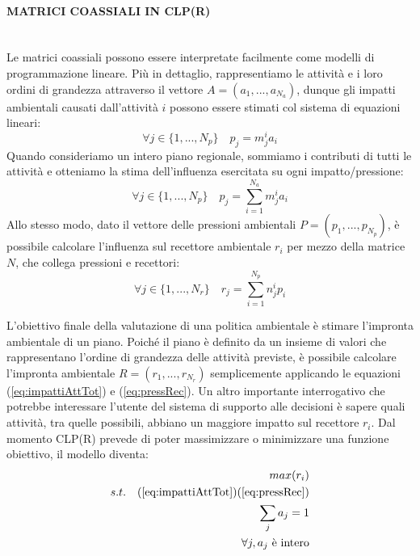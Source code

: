 \documentclass[12pt,a4paper,openright,twoside]{report}
\newcommand{\myparagraph}[1]{\paragraph{#1}\mbox{}\\}
\begin{document}
\myparagraph{MATRICI COASSIALI IN CLP(R)}
Le matrici coassiali possono essere interpretate facilmente come modelli di programmazione lineare. Più in dettaglio, rappresentiamo le attività e i loro ordini di grandezza attraverso il vettore $A = (a_1,...,a_{N_a})$, dunque gli impatti ambientali causati dall'attività $i$ possono essere stimati col sistema di equazioni lineari:
\begin{equation}
\label{eq:impattiAtt}
	\forall j \in \{1,...,N_p\}  \quad p_j = m_j^i a_i
\end{equation}
Quando consideriamo un intero piano regionale, sommiamo i contributi di tutti le attività e otteniamo la stima dell'influenza esercitata su ogni impatto/pressione:
\begin{equation}
\label{eq:impattiAttTot}
	\forall j \in \{1,...,N_p\}  \quad  p_j = \sum_{i=1}^{N_a} m_j^i a_i
\end{equation}
Allo stesso modo, dato il vettore delle pressioni ambientali $P = (p_1,...,p_{N_p})$, è possibile calcolare l'influenza sul recettore ambientale $r_i$ per mezzo della matrice $N$, che collega pressioni e recettori:
\begin{equation}
\label{eq:pressRec}
	\forall j \in \{1,...,N_r\}  \quad  r_j = \sum_{i=1}^{N_p} n_j^i p_i
\end{equation}

L'obiettivo finale della valutazione di una politica ambientale è stimare l'impronta ambientale di un piano. Poiché il piano è definito da un insieme di valori che rappresentano l'ordine di grandezza delle attività previste, è possibile calcolare l'impronta ambientale $R = (r_1,...,r_{N_r})$ semplicemente applicando le equazioni (\ref{eq:impattiAttTot}) e (\ref{eq:pressRec}).
Un altro importante interrogativo che potrebbe interessare l'utente del sistema di supporto alle decisioni è sapere quali attività, tra quelle possibili, abbiano un maggiore impatto sul recettore $r_i$. Dal momento CLP(R) prevede di poter massimizzare o minimizzare una funzione obiettivo, il modello diventa:
\begin{equation}
\label{eq:impactOnGivenRec}
	\begin{aligned}
		max(r_i) \\
		s.t.  \quad (\ref{eq:impattiAttTot}) (\ref{eq:pressRec}) \\
		\sum_j a_j = 1 \\
		\forall j, a_j \mbox{ è intero} 
	\end{aligned}
\end{equation}
\end{document}
